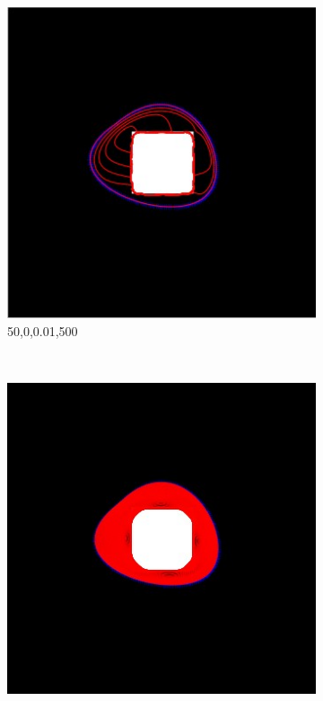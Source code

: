 \documentclass[paper=a4, fontsize=11pt]{scrartcl} %
\numberwithin{equation}{section} %
\numberwithin{figure}{section} %
\numberwithin{table}{section} %
\begin{document}
\begin{figure}[H]
\begin{subfigure}[b]{0.2\textwidth}
                \includegraphics[width=\textwidth]{114}
                \caption{50,0,0.01,500}
                \label{fig:Blacksquare6}
        \end{subfigure}
        ~ %
        \begin{subfigure}[b]{0.2\textwidth}
                \includegraphics[width=\textwidth]{118}

\end{subfigure}
\end{figure}
\end{document}
